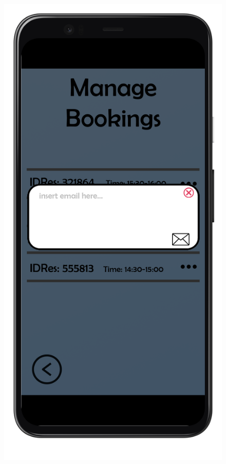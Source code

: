 \documentclass{article}
\begin{document}
		\newpage
		\begin{figure}[!h]
			\centering
			\begin{minipage}[!h]{0.4\textwidth}
				\includegraphics[width=\textwidth]{../Mockups/MBpopup2.png}

\end{minipage}
\end{figure}
\end{document}
